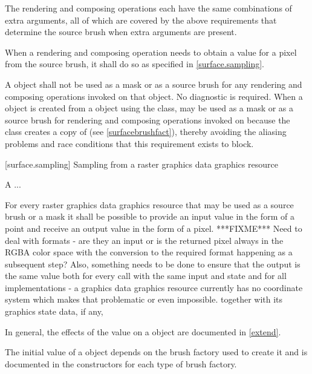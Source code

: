 \pnum
\enternote
The rendering and composing operations each have the same combinations of extra arguments, all of which are covered by the above requirements that determine the source brush when extra arguments are present.
\exitnote

\pnum
When a rendering and composing operation needs to obtain a value for a pixel from the source brush, it shall do so as specified in \ref{surface.sampling}. %

\pnum
A  object shall not be used as a mask or as a source brush for any rendering and composing operations invoked on that  object. No diagnostic is required.
\enternote
When a  object  is created from a  object  using the  class,  may be used as a mask or as a source brush for rendering and composing operations invoked on  because the  class creates a copy of  (see \ref{surfacebrushfact}), thereby avoiding the aliasing problems and race conditions that this requirement exists to block.
\exitnote

 [surface.sampling] {Sampling from a raster graphics data graphics resource}

\pnum
A ...

\pnum
For every raster graphics data graphics resource that may be used as a source brush or a mask it shall be possible to provide an input value in the form of a point and receive an output value in the form of a pixel. ***FIXME*** Need to deal with formats - are they an input or is the returned pixel always in the RGBA color space with the conversion to the required format happening as a subsequent step? Also, something needs to be done to ensure that the output is the same value both for every call with the same input and state and for all implementations - a graphics data graphics resource currently has no coordinate system which makes that problematic or even impossible. together with its graphics state data, if any,

\pnum
In general, the effects of the  value on a  object are documented in \ref{extend}.

\pnum
The initial  value of a  object depends on the brush factory used to create it and is documented in the  constructors for each type of brush factory.


